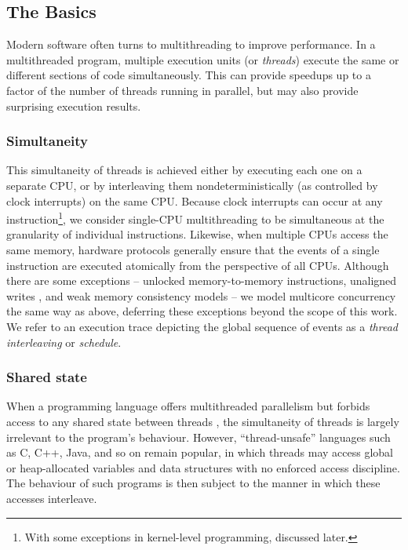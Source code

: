 \subsection{The Basics}

Modern software often turns to multithreading to improve performance.
In a multithreaded program, multiple execution units (or {\em threads}) execute the same or different sections of code simultaneously.
This can provide speedups up to a factor of the number of threads running in parallel,
but may also provide surprising execution results.

\subsubsection{Simultaneity}
This simultaneity of threads is achieved either by executing each one on a separate CPU, or by interleaving them nondeterministically (as controlled by clock interrupts) on the same CPU.
Because clock interrupts can occur at any instruction\footnote{
	With some exceptions in kernel-level programming, discussed later.
},
we consider single-CPU multithreading to be simultaneous at the granularity of individual instructions.
%
Likewise, when multiple CPUs access the same memory,
hardware protocols generally ensure that the events of a single instruction are executed atomically from the perspective of all CPUs.
Although there are some exceptions --
unlocked memory-to-memory instructions,
unaligned writes \cite{unaligned-writes},
and weak memory consistency models \cite{memory-consistency-models} --
we model multicore concurrency the same way as above,
deferring these exceptions beyond the scope of this work.
We refer to an execution trace depicting the global sequence of events as a {\em thread interleaving} or {\em schedule}.

\subsubsection{Shared state}
When a programming language offers multithreaded parallelism but forbids access to any shared state between threads \cite{rust-language},
the simultaneity of threads is largely irrelevant to the program's behaviour.
However, ``thread-unsafe'' languages such as C, C++, Java, and so on remain popular,
in which threads may access global or heap-allocated variables and data structures with no enforced access discipline.
The behaviour of such programs is then subject to the manner in which these accesses interleave.

